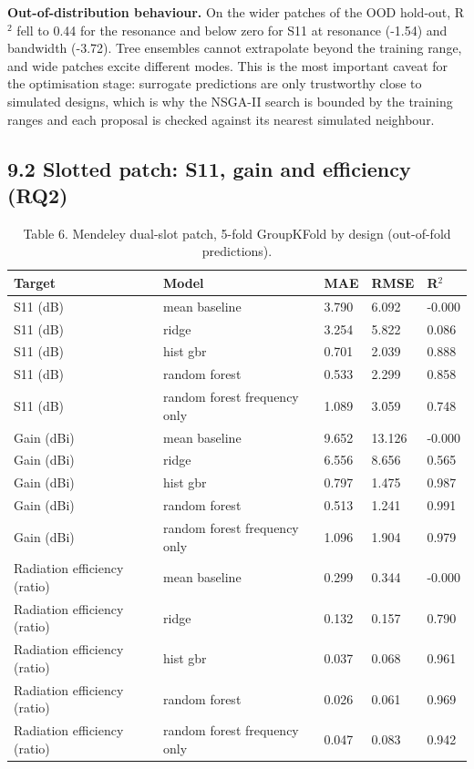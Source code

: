 \documentclass[11pt,a4paper]{article}
\begin{document}
\textbf{Out-of-distribution behaviour.} On the wider patches of the OOD hold-out, R$^2$ fell to 0.44 for the resonance and below zero for S11 at resonance (-1.54) and bandwidth (-3.72). Tree ensembles cannot extrapolate beyond the training range, and wide patches excite different modes. This is the most important caveat for the optimisation stage: surrogate predictions are only trustworthy close to simulated designs, which is why the NSGA-II search is bounded by the training ranges and each proposal is checked against its nearest simulated neighbour.

\subsection*{9.2 Slotted patch: S11, gain and efficiency (RQ2)}
\begin{table}[H]\centering\small
\caption*{Table 6. Mendeley dual-slot patch, 5-fold GroupKFold by design (out-of-fold predictions).}
\begin{tabularx}{\linewidth}{XXXXX}
\toprule
\textbf{Target} & \textbf{Model} & \textbf{MAE} & \textbf{RMSE} & \textbf{R$^2$} \\
\midrule
S11 (dB) & mean baseline & 3.790 & 6.092 & -0.000 \\
S11 (dB) & ridge & 3.254 & 5.822 & 0.086 \\
S11 (dB) & hist gbr & 0.701 & 2.039 & 0.888 \\
S11 (dB) & random forest & 0.533 & 2.299 & 0.858 \\
S11 (dB) & random forest frequency only & 1.089 & 3.059 & 0.748 \\
Gain (dBi) & mean baseline & 9.652 & 13.126 & -0.000 \\
Gain (dBi) & ridge & 6.556 & 8.656 & 0.565 \\
Gain (dBi) & hist gbr & 0.797 & 1.475 & 0.987 \\
Gain (dBi) & random forest & 0.513 & 1.241 & 0.991 \\
Gain (dBi) & random forest frequency only & 1.096 & 1.904 & 0.979 \\
Radiation efficiency (ratio) & mean baseline & 0.299 & 0.344 & -0.000 \\
Radiation efficiency (ratio) & ridge & 0.132 & 0.157 & 0.790 \\
Radiation efficiency (ratio) & hist gbr & 0.037 & 0.068 & 0.961 \\
Radiation efficiency (ratio) & random forest & 0.026 & 0.061 & 0.969 \\
Radiation efficiency (ratio) & random forest frequency only & 0.047 & 0.083 & 0.942 \\
\bottomrule
\end{tabularx}
\end{table}
\end{document}
